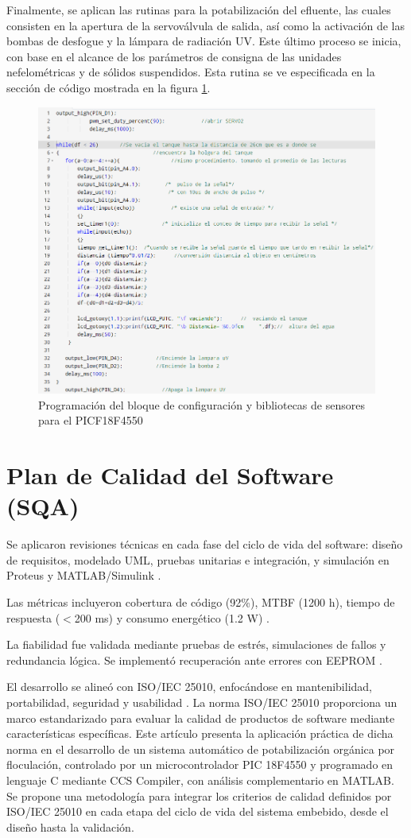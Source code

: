 \documentclass[conference]{IEEEtran}
\begin{document}
Finalmente, se aplican las rutinas para la potabilización del efluente, las cuales consisten en la apertura de la servoválvula de salida, así como la activación de las bombas de desfogue y la lámpara de radiación UV. Este último proceso se inicia, con base en el alcance de los parámetros de consigna de las unidades nefelométricas y de sólidos suspendidos. Esta rutina se ve especificada en la sección de código mostrada en la figura \ref{fig:20}.

\begin{figure}[htbp]
	\centering
	\includegraphics[width=0.8\columnwidth]{fig20.png}
	\caption{Programación del bloque de configuración y bibliotecas de sensores para el PICF18F4550}
	\label{fig:20}
\end{figure}

\section{Plan de Calidad del Software (SQA)}

Se aplicaron revisiones técnicas en cada fase del ciclo de vida del software: diseño de requisitos, modelado UML, pruebas unitarias e integración, y simulación en Proteus y MATLAB/Simulink \cite{b30}.

Las métricas incluyeron cobertura de código (92\%), MTBF (1200 h), tiempo de respuesta ($<$200 ms) y consumo energético (1.2 W) \cite{b31}.

La fiabilidad fue validada mediante pruebas de estrés, simulaciones de fallos y redundancia lógica. Se implementó recuperación ante errores con EEPROM \cite{b32}.

El desarrollo se alineó con ISO/IEC 25010, enfocándose en mantenibilidad, portabilidad, seguridad y usabilidad \cite{b33}. La norma ISO/IEC 25010 proporciona un marco estandarizado para evaluar la calidad de productos de software mediante características específicas. Este artículo presenta la aplicación práctica de dicha norma en el desarrollo de un sistema automático de potabilización orgánica por floculación, controlado por un microcontrolador PIC 18F4550 y programado en lenguaje C mediante CCS Compiler, con análisis complementario en MATLAB. Se propone una metodología para integrar los criterios de calidad definidos por ISO/IEC 25010 en cada etapa del ciclo de vida del sistema embebido, desde el diseño hasta la validación.
\end{document}
